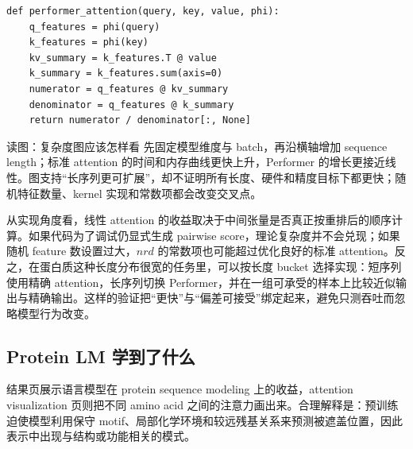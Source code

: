

\begin{lstlisting}[caption={线性化 attention 的计算顺序（示意）}]
def performer_attention(query, key, value, phi):
    q_features = phi(query)
    k_features = phi(key)
    kv_summary = k_features.T @ value
    k_summary = k_features.sum(axis=0)
    numerator = q_features @ kv_summary
    denominator = q_features @ k_summary
    return numerator / denominator[:, None]
\end{lstlisting}

\begin{knowledgebox}{读图：复杂度图应该怎样看}
先固定模型维度与 batch，再沿横轴增加 sequence length；标准 attention 的时间和内存曲线更快上升，Performer 的增长更接近线性。图支持“长序列更可扩展”，却不证明所有长度、硬件和精度目标下都更快；随机特征数量、kernel 实现和常数项都会改变交叉点。
\end{knowledgebox}

从实现角度看，线性 attention 的收益取决于中间张量是否真正按重排后的顺序计算。如果代码为了调试仍显式生成 pairwise score，理论复杂度并不会兑现；如果随机 feature 数设置过大，$n r d$ 的常数项也可能超过优化良好的标准 attention。反之，在蛋白质这种长度分布很宽的任务里，可以按长度 bucket 选择实现：短序列使用精确 attention，长序列切换 Performer，并在一组可承受的样本上比较近似输出与精确输出。这样的验证把“更快”与“偏差可接受”绑定起来，避免只测吞吐而忽略模型行为改变。


\subsection{Protein LM 学到了什么}

结果页展示语言模型在 protein sequence modeling 上的收益，attention visualization 页则把不同 amino acid 之间的注意力画出来。合理解释是：预训练迫使模型利用保守 motif、局部化学环境和较远残基关系来预测被遮盖位置，因此表示中出现与结构或功能相关的模式。


